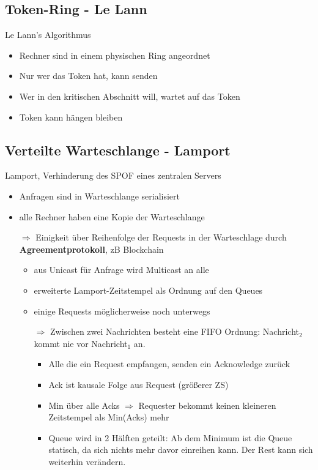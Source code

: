 \documentclass{scrartcl}
\begin{document}

\subsection{Token-Ring - Le Lann}
Le Lann's Algorithmus
\begin{itemize}
\item Rechner sind in einem physischen Ring angeordnet
\item Nur wer das Token hat, kann senden
\item Wer in den kritischen Abschnitt will, wartet auf das Token
\item \Lightning Token kann hängen bleiben
\end{itemize} 



\subsection{Verteilte Warteschlange - Lamport}
Lamport, Verhinderung des SPOF eines zentralen Servers
\begin{itemize}
\item Anfragen sind in Warteschlange serialisiert
\item alle Rechner haben eine Kopie der Warteschlange
\item[$\Rightarrow$] Einigkeit über Reihenfolge der Requests in der Warteschlage durch \textbf{Agreementprotokoll}, zB Blockchain
\begin{itemize}
\item aus Unicast für Anfrage wird Multicast an alle
\item erweiterte Lamport-Zeitstempel als Ordnung auf den Queues
\item \Lightning einige Requests möglicherweise noch unterwegs
\item[$\Rightarrow$] Zwischen zwei Nachrichten besteht eine FIFO Ordnung: Nachricht$_2$ kommt nie vor Nachricht$_1$ an.
\begin{itemize}
\item Alle die ein Request empfangen, senden ein Acknowledge zurück
\item Ack ist kausale Folge aus Request (größerer ZS)
\item Min über alle Acks $\Rightarrow$ Requester bekommt keinen kleineren Zeitstempel als Min(Acks) mehr
\item Queue wird in 2 Hälften geteilt: Ab dem Minimum ist die Queue statisch, da sich nichts mehr davor einreihen kann. Der Rest kann sich weiterhin verändern.
\end{itemize}
\end{itemize}
\end{itemize}
\end{document}
